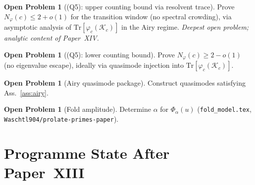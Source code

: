 \documentclass[12pt,a4paper]{amsart}
\theoremstyle{definition}
\newtheorem{problem}[theorem]{Open Problem}
\theoremstyle{remark}
\newcommand{\Kc}{\mathcal{K}_c}
\newcommand{\Tr}{\mathrm{Tr}}
\begin{document}
\begin{problem}[(Q5): upper counting bound via resolvent trace]
\label{prob:counting}
Prove $N_\varphi(c) \leq 2+o(1)$ for the transition window
(no spectral crowding), via asymptotic analysis of
$\Tr[\varphi_c(\Kc)]$ in the Airy regime.
\emph{Deepest open problem; analytic content of Paper~XIV.}
\end{problem}

\begin{problem}[(Q5): lower counting bound]
\label{prob:countinglower}
Prove $N_\varphi(c) \geq 2-o(1)$
(no eigenvalue escape), ideally via quasimode injection into
$\Tr[\varphi_c(\Kc)]$.
\end{problem}

\begin{problem}[Airy quasimode package]
\label{prob:quasimodes}
Construct quasimodes satisfying Ass.~\ref{ass:airy}.
\end{problem}

\begin{problem}[Fold amplitude]
\label{prob:fold}
Determine $\alpha$ for $\Phi_\alpha(u)$
(\texttt{fold\_model.tex}, \texttt{Waschtl904/prolate-primes-paper}).
\end{problem}

\section{Programme State After Paper~XIII}
\label{sec:state}
\end{document}
